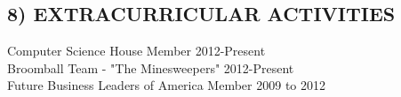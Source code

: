 \documentclass{res}
\begin{document}
\begin{resume}
\section{8) EXTRACURRICULAR ACTIVITIES}        
    \vspace{2pt}
    Computer Science House Member 2012-Present \\  
    Broomball Team - "The Minesweepers" 2012-Present\\     
    Future Business Leaders of America Member 2009 to 2012   
 
\end{resume}
\end{document}
